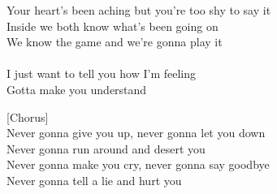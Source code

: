 Your heart's been aching but you're too shy to say it\\
Inside we both know what's been going on\\
We know the game and we're gonna play it\\
\\
I just want to tell you how I'm feeling\\
Gotta make you understand\par
\vspace{10pt}
{[}Chorus{]}\\
Never gonna give you up, never gonna let you down\\
Never gonna run around and desert you\\
Never gonna make you cry, never gonna say goodbye\\
Never gonna tell a lie and hurt you
